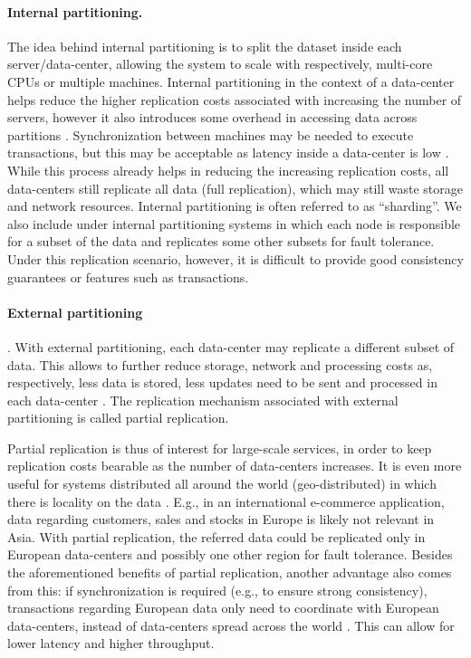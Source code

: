 \paragraph{Internal partitioning.}
The idea behind internal partitioning is to split the dataset inside each server/data-center, allowing the system to scale with respectively, multi-core CPUs or multiple machines.
Internal partitioning in the context of a data-center helps reduce the higher replication costs associated with increasing the number of servers, however it also introduces some overhead in accessing data across partitions \cite{dynamo, cops, mdcc}.
Synchronization between machines may be needed to execute transactions, but this may be acceptable as latency inside a data-center is low \cite{cops}.
While this process already helps in reducing the increasing replication costs, all data-centers still replicate all data (full replication), which may still waste storage and network resources.
Internal partitioning is often referred to as ``sharding''.
We also include under internal partitioning systems \cite{dynamo} in which each node is responsible for a subset of the data and replicates some other subsets for fault tolerance.
Under this replication scenario, however, it is difficult to provide good consistency guarantees or features such as transactions.

\paragraph{External partitioning}.
With external partitioning, each data-center may replicate a different subset of data.
This allows to further reduce storage, network and processing costs as, respectively, less data is stored, less updates need to be sent and processed in each data-center \cite{spanner, sipre}.
The replication mechanism associated with external partitioning is called partial replication.

Partial replication is thus of interest for large-scale services, in order to keep replication costs bearable as the number of data-centers increases.
It is even more useful for systems distributed all around the world (geo-distributed) in which there is locality on the data \cite{sipre, slog}.
E.g., in an international e-commerce application, data regarding customers, sales and stocks in Europe is likely not relevant in Asia.
With partial replication, the referred data could be replicated only in European data-centers and possibly one other region for fault tolerance.
Besides the aforementioned benefits of partial replication, another advantage also comes from this: if synchronization is required (e.g., to ensure strong consistency), transactions regarding European data only need to coordinate with European data-centers, instead of data-centers spread across the world \cite{spanner, sipre, slog}.
This can allow for lower latency and higher throughput.


